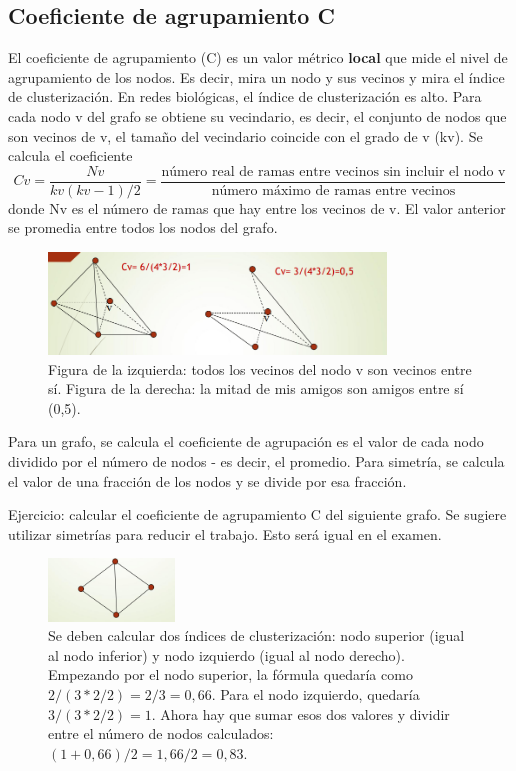 \subsection{Coeficiente de agrupamiento C}
El coeficiente de agrupamiento (C) es un valor métrico \textbf{local} que mide el nivel de agrupamiento de los nodos. Es decir, mira un nodo y sus vecinos y mira el índice de clusterización. En redes biológicas, el índice de clusterización es alto. Para cada nodo v del grafo se obtiene su vecindario, es decir, el conjunto de nodos que son vecinos de v, el tamaño del vecindario coincide con el grado de v (kv). Se calcula el coeficiente
$$Cv = \frac{Nv}{kv(kv-1)/2} = \frac{\text{número real de ramas entre vecinos sin incluir el nodo v}}{\text{número máximo de ramas entre vecinos}}$$
donde Nv es el número de ramas que hay entre los vecinos de v. El valor anterior se promedia entre todos los nodos del grafo. 

\begin{figure}[h]
\centering
\includegraphics[width = 0.8\textwidth]{figs/coeficiente-agrupamiento.png}
\caption{Figura de la izquierda: todos los vecinos del nodo v son vecinos entre sí. Figura de la derecha: la mitad de mis amigos son amigos entre sí (0,5).}
\end{figure}

Para un grafo, se calcula el coeficiente de agrupación es el valor de cada nodo dividido por el número de nodos - es decir, el promedio. Para simetría, se calcula el valor de una fracción de los nodos y se divide por esa fracción.

Ejercicio: calcular el coeficiente de agrupamiento C del siguiente grafo. Se sugiere utilizar simetrías para reducir el trabajo. Esto será igual en el examen. 

\begin{figure}[h]
\centering
\includegraphics[width = 0.3\textwidth]{figs/ejercicio-calculo-c.png}
\caption{Se deben calcular dos índices de clusterización: nodo superior (igual al nodo inferior) y nodo izquierdo (igual al nodo derecho). Empezando por el nodo superior, la fórmula quedaría como $2/(3*2/2) = 2/3 = 0,66$. Para el nodo izquierdo, quedaría $3/(3*2/2) = 1$. Ahora hay que sumar esos dos valores y dividir entre el número de nodos calculados: $(1 + 0,66)/ 2 = 1,66/2 = 0,83$.}
\end{figure}

